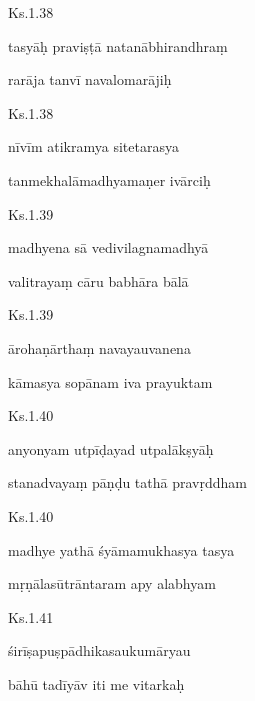 \documentclass{tufte-handout}
\newenvironment{sanskrit}%
{\begin{otherlanguage}{sanskrit-devanagari}}%
{\end{otherlanguage}}
\begin{document}
    
	\begin{sanskrit}
	
	    
		Ks.1.38 
    
	    
		tasyāḥ praviṣṭā natanābhirandhraṃ 
    
	    
		rarāja tanvī navalomarājiḥ 
    
	\end{sanskrit}

    
	\begin{sanskrit}
	
	    
		Ks.1.38 
    
	    
		nīvīm atikramya sitetarasya 
    
	    
		tanmekhalāmadhyamaṇer ivārciḥ 
    
	\end{sanskrit}

    
	\begin{sanskrit}
	
	    
		Ks.1.39 
    
	    
		madhyena sā vedivilagnamadhyā 
    
	    
		valitrayaṃ cāru babhāra bālā 
    
	\end{sanskrit}

    
	\begin{sanskrit}
	
	    
		Ks.1.39 
    
	    
		ārohaṇārthaṃ navayauvanena 
    
	    
		kāmasya sopānam iva prayuktam 
    
	\end{sanskrit}

    
	\begin{sanskrit}
	
	    
		Ks.1.40 
    
	    
		anyonyam utpīḍayad utpalākṣyāḥ 
    
	    
		stanadvayaṃ pāṇḍu tathā pravṛddham 
    
	\end{sanskrit}

    
	\begin{sanskrit}
	
	    
		Ks.1.40 
    
	    
		madhye yathā śyāmamukhasya tasya 
    
	    
		mṛṇālasūtrāntaram apy alabhyam 
    
	\end{sanskrit}

    
	\begin{sanskrit}
	
	    
		Ks.1.41 
    
	    
		śirīṣapuṣpādhikasaukumāryau 
    
	    
		bāhū tadīyāv iti me vitarkaḥ 
    
	\end{sanskrit}
\end{document}
